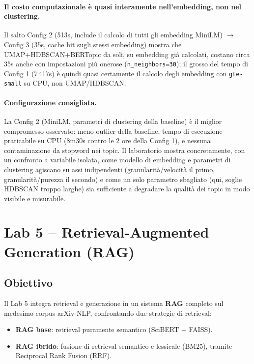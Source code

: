 \documentclass[12pt,a4paper]{article}
\begin{document}
\paragraph{Il costo computazionale \`e quasi interamente nell'embedding, non nel clustering.} Il salto Config 2 (513s, include il calcolo di tutti gli embedding MiniLM) $\to$ Config 3 (35s, cache hit sugli stessi embedding) mostra che UMAP+HDBSCAN+BERTopic da soli, su embedding gi\`a calcolati, costano circa 35s anche con impostazioni pi\`u onerose (\texttt{n\_neighbors=30}); il grosso del tempo di Config 1 (7\,417s) \`e quindi quasi certamente il calcolo degli embedding con \texttt{gte-small} su CPU, non UMAP/HDBSCAN.

\paragraph{Configurazione consigliata.} La Config 2 (MiniLM, parametri di clustering della baseline) \`e il miglior compromesso osservato: meno outlier della baseline, tempo di esecuzione praticabile su CPU (8m30s contro le 2 ore della Config 1), e nessuna contaminazione da stopword nei topic. Il laboratorio mostra concretamente, con un confronto a variabile isolata, come modello di embedding e parametri di clustering agiscano su assi indipendenti (granularit\`a/velocit\`a il primo, granularit\`a/purezza il secondo) e come un solo parametro sbagliato (qui, soglie HDBSCAN troppo larghe) sia sufficiente a degradare la qualit\`a dei topic in modo visibile e misurabile.

\section{Lab 5 -- Retrieval-Augmented Generation (RAG)}

\subsection{Obiettivo}

Il Lab 5 integra retrieval e generazione in un sistema \textbf{RAG} completo sul medesimo corpus arXiv-NLP, confrontando due strategie di retrieval:

\begin{itemize}[noitemsep]
  \item \textbf{RAG base}: retrieval puramente semantico (SciBERT + FAISS).
  \item \textbf{RAG ibrido}: fusione di retrieval semantico e lessicale (BM25), tramite Reciprocal Rank Fusion (RRF).
\end{itemize}
\end{document}
